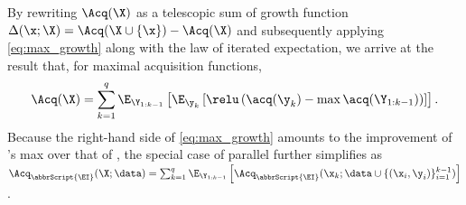 By rewriting \(\Acq(\X)\) as a telescopic sum of growth function
\(
\Delta(\x; \X) = \Acq(\X \cup \{\x\}) - \Acq(\X)
\)
and subsequently applying \eqref{eq:max_growth} along with the law of iterated expectation, we arrive at the result that, for  maximal acquisition functions,
\begin{align}
\Acq(\X)
    =
    \sum_{k=1}^{q} 
        \E_{\Y_{1:k-1}}
        \left[
            \E_{\y_{k}}
            \left[
                 \relu\left(\acq(\y_k) - \max \acq(\Y_{1:k-1})\right)
            \right]
        \right].
\label{eq:iterated_form}
\end{align}
Because the right-hand side of \eqref{eq:max_growth} amounts to the improvement of \setB's max over that of \setA, the special case of parallel \EI{} further simplifies as
\(
\Acq_{\abbrScript{\EI}}(\X; \data)
    = \sum_{k=1}^{q}\E_{\Y_{1:k-1}}
    \left[
        \Acq_{\abbrScript{\EI}}(\x_{k}; \data \cup \{(\x_i,\y_i)\}_{i=1}^{k-1})
    \right]
\).




